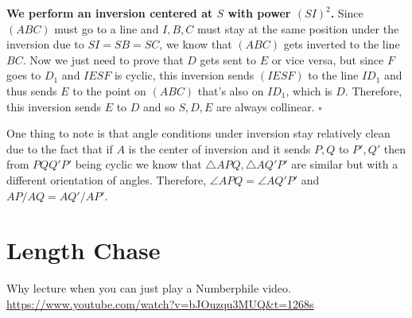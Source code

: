 \documentclass{scrartcl}
\begin{document}
\textbf{We perform an inversion centered at $S$ with power $(SI)^2$.} Since $(ABC)$ must go to a line and $I,B,C$ must stay at the same position under the inversion due to $SI = SB = SC$, we know that $(ABC)$ gets inverted to the line $BC$. Now we just need to prove that $D$ gets sent to $E$ or vice versa, but since $F$ goes to $D_1$ and $IESF$ is cyclic, this inversion sends $(IESF)$ to the line $ID_1$ and thus sends $E$ to the point on $(ABC)$ that's also on $ID_1$, which is $D$. Therefore, this inversion sends $E$ to $D$ and so $S,D,E$ are always collinear. $\square$\newline

One thing to note is that angle conditions under inversion stay relatively clean due to the fact that if $A$ is the center of inversion and it sends $P,Q$ to $P',Q'$ then from $PQQ'P'$ being cyclic we know that $\triangle APQ, \triangle AQ'P'$ are similar but with a different orientation of angles. Therefore, $\angle APQ = \angle AQ'P'$ and $AP/AQ = AQ'/AP'$.

\section{Length Chase}
Why lecture when you can just play a Numberphile video. \newline
\href{https://www.youtube.com/watch?v=bJOuzqu3MUQ&t=1268s}{https://www.youtube.com/watch?v=bJOuzqu3MUQ\&t=1268s}
\end{document}
